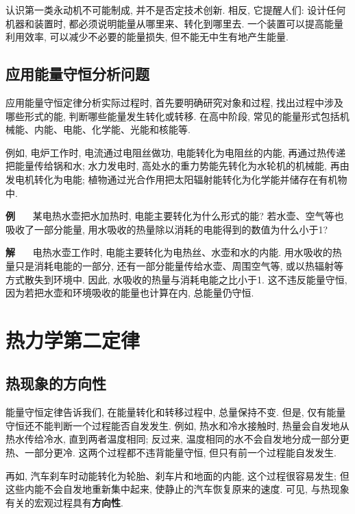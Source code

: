 \documentclass[11pt,a4paper]{ctexbook}
\newcounter{exam}[chapter]
\newcommand{\bre}{\ \ \ }
\newcommand{\examlabel}{\textbf{例\theexam}}
\newcommand{\soln}{\textbf{解}\bre}
\newenvironment{example}{\bigskip\par\refstepcounter{exam}\examlabel\bre}{\par}
\newenvironment{solution}{\par\soln}{\par\bigskip}
\begin{document}
认识第一类永动机不可能制成, 并不是否定技术创新. 相反, 它提醒人们: 设计任何机器和装置时,
都必须说明能量从哪里来、转化到哪里去. 一个装置可以提高能量利用效率, 可以减少不必要的能量损失,
但不能无中生有地产生能量.

\subsection{应用能量守恒分析问题}

应用能量守恒定律分析实际过程时, 首先要明确研究对象和过程, 找出过程中涉及哪些形式的能,
判断哪些能量发生转化或转移. 在高中阶段, 常见的能量形式包括机械能、内能、电能、化学能、光能和核能等.

例如, 电炉工作时, 电流通过电阻丝做功, 电能转化为电阻丝的内能, 再通过热传递把能量传给锅和水;
水力发电时, 高处水的重力势能先转化为水轮机的机械能, 再由发电机转化为电能;
植物通过光合作用把太阳辐射能转化为化学能并储存在有机物中.

\begin{example}
某电热水壶把水加热时, 电能主要转化为什么形式的能? 若水壶、空气等也吸收了一部分能量,
用水吸收的热量除以消耗的电能得到的数值为什么小于1?
\end{example}
\begin{solution}
电热水壶工作时, 电能主要转化为电热丝、水壶和水的内能. 用水吸收的热量只是消耗电能的一部分,
还有一部分能量传给水壶、周围空气等, 或以热辐射等方式散失到环境中. 因此, 水吸收的热量与消耗电能之比小于1.
这不违反能量守恒, 因为若把水壶和环境吸收的能量也计算在内, 总能量仍守恒.
\end{solution}

\section{热力学第二定律}

\subsection{热现象的方向性}

能量守恒定律告诉我们, 在能量转化和转移过程中, 总量保持不变. 但是, 仅有能量守恒还不能判断一个过程能否自发发生.
例如, 热水和冷水接触时, 热量会自发地从热水传给冷水, 直到两者温度相同; 反过来,
温度相同的水不会自发地分成一部分更热、一部分更冷. 这两个过程都不违背能量守恒,
但只有前一个过程能自发发生.

再如, 汽车刹车时动能转化为轮胎、刹车片和地面的内能, 这个过程很容易发生;
但这些内能不会自发地重新集中起来, 使静止的汽车恢复原来的速度. 可见, 与热现象有关的宏观过程具有\textbf{方向性}.
\end{document}
